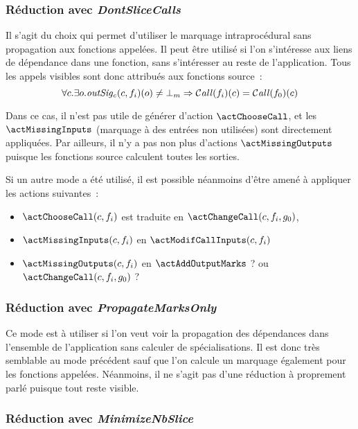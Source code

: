 \subsubsection{Réduction avec {\it DontSliceCalls}}\label{sec-DontSliceCalls}

Il s'agit du choix qui permet d'utiliser le marquage intraprocédural sans
propagation aux fonctions appelées.
Il peut être utilisé si l'on s'intéresse aux liens de dépendance 
dans une fonction, sans s'intéresser au reste de l'application.
Tous les appels visibles sont donc attribués aux fonctions source~:
$$\forall c. \exists o. \mathit{outSig_c}(c, f_i)(o) \neq {\bot}_m 
\Rightarrow \operatorname{\mathcal{C\mathit{all}}}(f_i)(c) = \operatorname{\mathcal{C\mathit{all}}}(f_0)(c)$$

Dans ce cas, il n'est pas utile de générer d'action $\actChooseCall$,
et les $\actMissingInputs$ (marquage à \spare{} des entrées non utilisées)
sont directement appliquées. 
Par ailleurs, il n'y a pas non plus d'actions
$\actMissingOutputs$ puisque les fonctions source calculent toutes les sorties.
\bb

Si un autre mode a été utilisé, il est possible néanmoins d'être amené à
appliquer les actions suivantes~:

\begin{itemize}
  \item $\actChooseCall(c, f_i)$ est traduite en $\actChangeCall(c, f_i, g_0)$,
  \item $\actMissingInputs(c, f_i)$ en $\actModifCallInputs(c, f_i)$
  \item $\actMissingOutputs(c, f_i)$ en $\actAddOutputMarks$ ?
    ou $\actChangeCall(c, f_i, g_0)$ ?
\end{itemize}

\subsubsection{Réduction avec {\it PropagateMarksOnly}}\label{sec-PropagateMarksOnly}

Ce mode est à utiliser si l'on veut voir la propagation des dépendances
dans l'ensemble de l'application sans calculer de spécialisations.
Il est donc très semblable au mode précédent sauf que l'on calcule un marquage
également pour les fonctions appelées. Néanmoins, il ne s'agit pas d'une
réduction à proprement parlé puisque tout reste visible.

\subsubsection{Réduction avec {\it MinimizeNbSlice}}\label{sec-MinimizeNbSlice}


